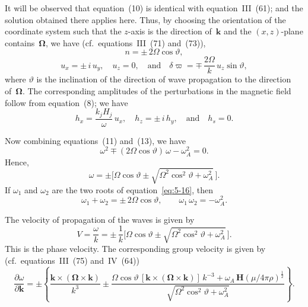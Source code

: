 It will be observed that equation~(10) is identical with equation~III~(61);
and the solution obtained there applies here.  Thus, by choosing the
orientation of the coordinate system such that the $z$-axis is the direction
of~$\mathbf{k}$ and the $(x,z)$-plane contains~$\boldsymbol{\Omega}$, we have
(cf.\ equations~III~(71) and~(73)),
\begin{equation}
  n = \pm\,2\Omega\cos\vartheta,
  \label{eq:5-13}
\end{equation}
\begin{equation}
  u_{x} = \pm\,i\,u_{y},\quad
  u_{z} = 0,\quad\text{and}\quad
  \delta\varpi = \mp\,\frac{2\Omega}{k}\,u_{z}\sin\vartheta,
  \label{eq:5-14}
\end{equation}
where $\vartheta$ is the inclination of the direction of wave propagation to
the direction of~$\boldsymbol{\Omega}$.  The corresponding amplitudes of the
perturbations in the magnetic field follow from equation~(8); we have
\begin{equation}
  h_{x} = \frac{k_{j}H_{j}}{\omega}\,u_{x},\quad
  h_{z} = \pm\,i\,h_{y},\quad\text{and}\quad
  h_{s} = 0.
  \label{eq:5-15}
\end{equation}

Now combining equations~(11) and~(13), we have
\begin{equation}
  \omega^{2} \mp (2\Omega\cos\vartheta)\,\omega - \omega_{A}^{2} = 0.
  \label{eq:5-16}
\end{equation}
Hence,
\begin{equation}
  \omega = \pm\bigl[\Omega\cos\vartheta
    \pm\sqrt{\Omega^{2}\cos^{2}\!\vartheta+\omega_{A}^{2}}\,\bigr].
  \label{eq:5-17}
\end{equation}
If $\omega_{1}$ and $\omega_{2}$ are the two roots of equation~\eqref{eq:5-16},
then
\begin{equation}
  \omega_{1}+\omega_{2} = \pm\,2\Omega\cos\vartheta,\qquad
  \omega_{1}\,\omega_{2} = -\omega_{A}^{2}.
  \label{eq:5-18}
\end{equation}

The velocity of propagation of the waves is given by
\begin{equation}
  V = \frac{\omega}{k}
    = \pm\,\frac{1}{k}
    \bigl[\Omega\cos\vartheta
      \pm\sqrt{\Omega^{2}\cos^{2}\!\vartheta+\omega_{A}^{2}}\,\bigr].
  \label{eq:5-19}
\end{equation}
This is the phase velocity.  The corresponding group velocity is given
by (cf.\ equations~III~(75) and~IV~(64))
\begin{equation}
  \frac{\partial\omega}{\partial\mathbf{k}}
  = \pm\left\{
    \frac{\mathbf{k}\times(\boldsymbol{\Omega}\times\mathbf{k})}{k^{3}}
    \pm\frac{\Omega\cos\vartheta\,
      [\mathbf{k}\times(\boldsymbol{\Omega}\times\mathbf{k})]\,k^{-3}
      +\omega_{A}\,\mathbf{H}(\mu/4\pi\rho)^{\frac{1}{2}}}%
    {\sqrt{\Omega^{2}\cos^{2}\!\vartheta+\omega_{A}^{2}}}
  \right\}.
  \label{eq:5-20}
\end{equation}

